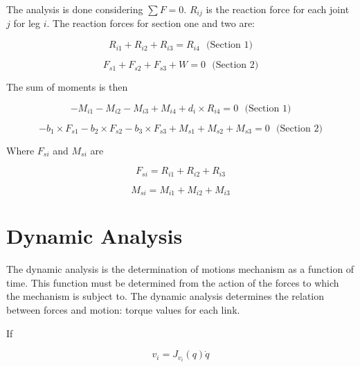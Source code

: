 \documentclass[titlepage, letterpaper]{article}
\begin{document}
The analysis is done considering $\sum F = 0$.
$R_{ij}$ is the reaction force for each joint $j$ for leg $i$.
The reaction forces for section one and two are:

\begin{equation}
    \label{eq:reaction_for_section1}
    R_{i1} + R_{i2} + R_{i3} = R_{i4} \,\,\,\, \text{(Section 1)}
\end{equation}

\begin{equation}
    F_{s1} + F_{s2} + F_{s3} + W = 0 \,\,\,\, \text{(Section 2)}
\end{equation}

The sum of moments is then

\begin{equation}
    \label{eq:sum_of_moments_sec1}
    -M_{i1} -M_{i2} -M_{i3} + M_{i4} + d_i \times R_{i4} = 0 \,\,\,\, \text{(Section 1)}
\end{equation}

\begin{equation}
    \label{eq:sum_of_moments_sec2}
    -b_1 \times F_{s1} - b_2 \times F_{s2} -b_3 \times F_{s3} + M_{s1} + M_{s2} + M_{s3} = 0 \,\,\,\, \text{(Section 2)}
\end{equation}

Where $F_{si}$ and $M_{si}$ are

\begin{equation}
    F_{si} = R_{i1} + R_{i2} + R_{i3}
\end{equation}

\begin{equation}
    M_{si} = M_{i1} + M_{i2} + M_{i3}
\end{equation}

\section{Dynamic Analysis}
\label{sec:dynamic}

The dynamic analysis is the determination of motions mechanism as a function of time.
This function must be determined from the action of the forces to which the mechanism is subject to.
The dynamic analysis determines the relation between forces and motion: torque values for each link.

If

\begin{equation}
  \label{eq:dynamic_vi}
  v_i = J_{v_i}(q)\dot{q}
\end{equation}
\end{document}
